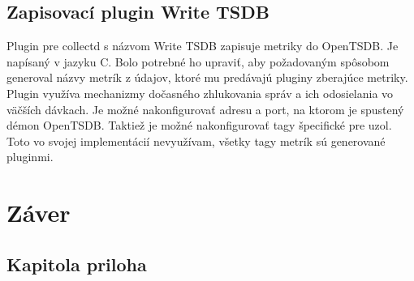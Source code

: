 \documentclass[11pt,final,oneside]{fithesis}
\begin{document}
\section{Zapisovací plugin Write TSDB}
Plugin pre collectd s názvom Write TSDB zapisuje metriky do OpenTSDB.\cite{13} Je napísaný v jazyku C. Bolo potrebné ho upraviť,
aby požadovaným spôsobom generoval názvy metrík z údajov, ktoré mu predávajú pluginy zberajúce metriky. Plugin využíva mechanizmy
dočasného zhlukovania správ a ich odosielania vo väčších dávkach. Je možné nakonfigurovať adresu a port, na ktorom je spustený
démon OpenTSDB. Taktiež je možné nakonfigurovať tagy špecifické pre uzol. Toto vo svojej implementácií nevyužívam,
všetky tagy metrík sú generované pluginmi.

\chapter{Záver}


\nocite{*}



\begin{appendix}
\chapter{Kapitola priloha}
\end{appendix}
\end{document}

